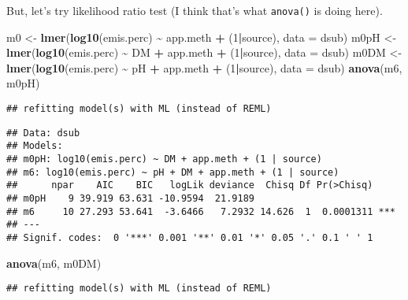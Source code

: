\documentclass[
]{article}
\newenvironment{Shaded}{\begin{snugshade}}{\end{snugshade}}
\newcommand{\AttributeTok}[1]{\textcolor[rgb]{0.13,0.29,0.53}{#1}}
\newcommand{\DecValTok}[1]{\textcolor[rgb]{0.00,0.00,0.81}{#1}}
\newcommand{\FunctionTok}[1]{\textcolor[rgb]{0.13,0.29,0.53}{\textbf{#1}}}
\newcommand{\NormalTok}[1]{#1}
\newcommand{\OtherTok}[1]{\textcolor[rgb]{0.56,0.35,0.01}{#1}}
\newcommand{\SpecialCharTok}[1]{\textcolor[rgb]{0.81,0.36,0.00}{\textbf{#1}}}
\begin{document}
But, let's try likelihood ratio test (I think that's what
\texttt{anova()} is doing here).

\begin{Shaded}
\begin{Highlighting}[]
\NormalTok{m0 }\OtherTok{\textless{}{-}} \FunctionTok{lmer}\NormalTok{(}\FunctionTok{log10}\NormalTok{(emis.perc) }\SpecialCharTok{\textasciitilde{}}\NormalTok{ app.meth }\SpecialCharTok{+}\NormalTok{ (}\DecValTok{1}\SpecialCharTok{|}\NormalTok{source), }\AttributeTok{data =}\NormalTok{ dsub)}
\NormalTok{m0pH }\OtherTok{\textless{}{-}} \FunctionTok{lmer}\NormalTok{(}\FunctionTok{log10}\NormalTok{(emis.perc) }\SpecialCharTok{\textasciitilde{}}\NormalTok{ DM }\SpecialCharTok{+}\NormalTok{ app.meth }\SpecialCharTok{+}\NormalTok{ (}\DecValTok{1}\SpecialCharTok{|}\NormalTok{source), }\AttributeTok{data =}\NormalTok{ dsub)}
\NormalTok{m0DM }\OtherTok{\textless{}{-}} \FunctionTok{lmer}\NormalTok{(}\FunctionTok{log10}\NormalTok{(emis.perc) }\SpecialCharTok{\textasciitilde{}}\NormalTok{ pH }\SpecialCharTok{+}\NormalTok{ app.meth }\SpecialCharTok{+}\NormalTok{ (}\DecValTok{1}\SpecialCharTok{|}\NormalTok{source), }\AttributeTok{data =}\NormalTok{ dsub)}
\FunctionTok{anova}\NormalTok{(m6, m0pH)}
\end{Highlighting}
\end{Shaded}

\begin{verbatim}
## refitting model(s) with ML (instead of REML)
\end{verbatim}

\begin{verbatim}
## Data: dsub
## Models:
## m0pH: log10(emis.perc) ~ DM + app.meth + (1 | source)
## m6: log10(emis.perc) ~ pH + DM + app.meth + (1 | source)
##      npar    AIC    BIC   logLik deviance  Chisq Df Pr(>Chisq)    
## m0pH    9 39.919 63.631 -10.9594  21.9189                         
## m6     10 27.293 53.641  -3.6466   7.2932 14.626  1  0.0001311 ***
## ---
## Signif. codes:  0 '***' 0.001 '**' 0.01 '*' 0.05 '.' 0.1 ' ' 1
\end{verbatim}

\begin{Shaded}
\begin{Highlighting}[]
\FunctionTok{anova}\NormalTok{(m6, m0DM)}
\end{Highlighting}
\end{Shaded}

\begin{verbatim}
## refitting model(s) with ML (instead of REML)
\end{verbatim}
\end{document}
